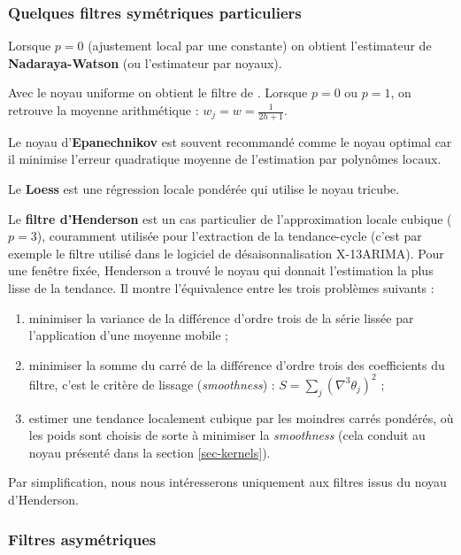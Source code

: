 \documentclass[
  11pt,
  french,
  a4paper]{article}
\providecommand{\tightlist}{%
  \setlength{\itemsep}{0pt}\setlength{\parskip}{0pt}}
\newcommand\1{\mathds{1}}
\begin{document}
\hypertarget{sec-sympolyfilter}{%
\subsubsection{Quelques filtres symétriques particuliers}\label{sec-sympolyfilter}}

Lorsque \(p=0\) (ajustement local par une constante) on obtient l'estimateur de \textbf{Nadaraya-Watson} (ou l'estimateur par noyaux).

Avec le noyau uniforme on obtient le filtre de \textcite{macaulay1931smoothing}.
Lorsque \(p=0\) ou \(p=1\), on retrouve la moyenne arithmétique : \(w_j=w=\frac{1}{2h+1}\).

Le noyau d'\textbf{Epanechnikov} est souvent recommandé comme le noyau optimal car il minimise l'erreur quadratique moyenne de l'estimation par polynômes locaux.

Le \textbf{Loess} est une régression locale pondérée qui utilise le noyau tricube.

Le \textbf{filtre d'Henderson} est un cas particulier de l'approximation locale cubique (\(p=3\)), couramment utilisée pour l'extraction de la tendance-cycle (c'est par exemple le filtre utilisé dans le logiciel de désaisonnalisation X-13ARIMA).
Pour une fenêtre fixée, Henderson a trouvé le noyau qui donnait l'estimation la plus lisse de la tendance.
Il montre l'équivalence entre les trois problèmes suivants :

\begin{enumerate}
\def\labelenumi{\arabic{enumi}.}
\tightlist
\item
  minimiser la variance de la différence d'ordre trois de la série lissée par l'application d'une moyenne mobile ;\\
\item
  minimiser la somme du carré de la différence d'ordre trois des coefficients du filtre, c'est le critère de lissage (\emph{smoothness}) : \(S=\sum_j(\nabla^{3}\theta_{j})^{2}\) ;\\
\item
  estimer une tendance localement cubique par les moindres carrés pondérés, où les poids sont choisis de sorte à minimiser la \emph{smoothness} (cela conduit au noyau présenté dans la section \ref{sec-kernels}).
\end{enumerate}

Par simplification, nous nous intéresserons uniquement aux filtres issus du noyau d'Henderson.

\hypertarget{filtres-asymuxe9triques}{%
\subsubsection{Filtres asymétriques}\label{filtres-asymuxe9triques}}
\end{document}
